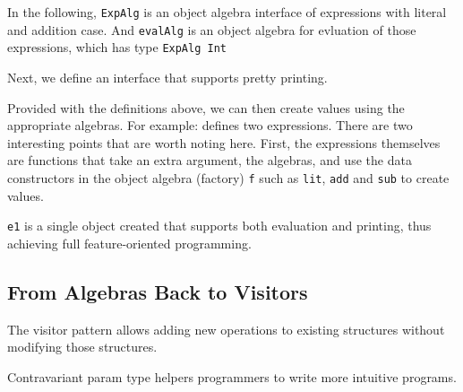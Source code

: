 In the following, \lstinline{ExpAlg} is an object algebra interface of
expressions with literal and addition case. And \lstinline{evalAlg} is an object
algebra for evluation of those expressions, which has type \lstinline{ExpAlg Int}


Next, we define an interface that supports pretty printing.


Provided with the definitions above, we can then create values using the
appropriate algebras. For example:
defines two expressions. There are two interesting points that are worth noting here.
First, the expressions themselves are functions that take an extra argument, the
algebras, and use the data constructors in the object algebra (factory)
\lstinline{f} such as \lstinline{lit}, \lstinline{add}  and \lstinline{sub}
to create values.


\lstinline{e1} is a single object created that supports both evaluation and
printing, thus achieving full feature-oriented programming.

\subsection{From Algebras Back to Visitors}

The visitor pattern allows adding new operations to existing structures without
modifying those structures.



Contravariant param type helpers programmers to write more intuitive programs.



